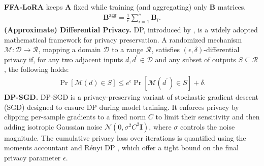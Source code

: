 \textbf{FFA-LoRA} \citep{sun2024improving} keeps \( \mathbf{A} \) fixed while training (and aggregating) only \( \mathbf{B} \) matrices.
\begin{align}
    \mathbf{B}^{\text{agg}} = \frac{1}{c} \sum_{i=1}^{c} \mathbf{B}_i.
\end{align}
% 
\quad \textbf{(Approximate) Differential Privacy.} 
DP, introduced by \citet{dwork2006differential}, is a widely adopted mathematical framework for privacy preservation. A randomized mechanism \( \mathcal{M}: \mathcal{D} \rightarrow \mathcal{R} \), mapping a domain \( \mathcal{D} \) to a range \( \mathcal{R} \), satisfies \((\epsilon, \delta)\)-differential privacy if, for any two adjacent inputs \( d, d^{\prime} \in \mathcal{D} \) and any subset of outputs \( S \subseteq \mathcal{R} \), the following holds:
\begin{align}
    \operatorname{Pr}[\mathcal{M}(d) \in S] \leq e^{\epsilon} \operatorname{Pr}[\mathcal{M}(d^{\prime}) \in S] + \delta.
\end{align}
\quad \textbf{DP-SGD.} 
DP-SGD \citep{dgsgd} is a privacy-preserving variant of stochastic gradient descent (SGD) designed to ensure DP during model training. 
It enforces privacy by clipping per-sample gradients to a fixed norm \( C \) to limit their sensitivity and then adding isotropic Gaussian noise \( \mathcal{N}\left(0, \sigma^2 C^2 \mathbf{I}\right) \), where \( \sigma \) controls the noise magnitude. 
The cumulative privacy loss over iterations is quantified using the moments accountant \citep{moments} and Rényi DP \citep{mironov2017renyi}, which offer a tight bound on the final privacy parameter \( \epsilon \).
